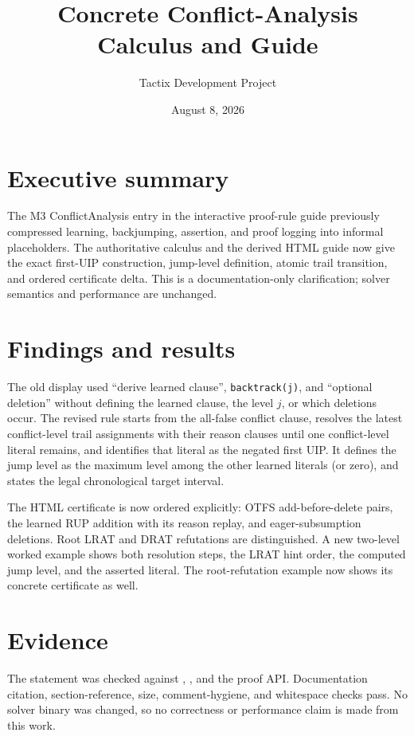 \documentclass[11pt]{article}
\title{Concrete Conflict-Analysis Calculus and Guide}
\author{Tactix Development Project}
\date{August 8, 2026}
\begin{document}
\maketitle

\section*{Executive summary}
The M3 ConflictAnalysis entry in the interactive proof-rule guide previously
compressed learning, backjumping, assertion, and proof logging into informal
placeholders.  The authoritative calculus and the derived HTML guide now give
the exact first-UIP construction, jump-level definition, atomic trail
transition, and ordered certificate delta.  This is a documentation-only
clarification; solver semantics and performance are unchanged.

\section{Findings and results}
The old display used ``derive learned clause'', \texttt{backtrack(j)}, and
``optional deletion'' without defining the learned clause, the level $j$, or
which deletions occur.  The revised rule starts from the all-false conflict
clause, resolves the latest conflict-level trail assignments with their reason
clauses until one conflict-level literal remains, and identifies that literal
as the negated first UIP.  It defines the jump level as the maximum level among
the other learned literals (or zero), and states the legal chronological target
interval.

The HTML certificate is now ordered explicitly: OTFS add-before-delete pairs,
the learned RUP addition with its reason replay, and eager-subsumption
deletions.  Root LRAT and DRAT refutations are distinguished.  A new two-level
worked example shows both resolution steps, the LRAT hint order, the computed
jump level, and the asserted literal.  The root-refutation example now shows
its concrete certificate as well.

\section{Evidence}
The statement was checked against ,
, and the proof API.  Documentation
citation, section-reference, size, comment-hygiene, and whitespace checks pass.
No solver binary was changed, so no correctness or performance claim is made
from this work.
\end{document}
